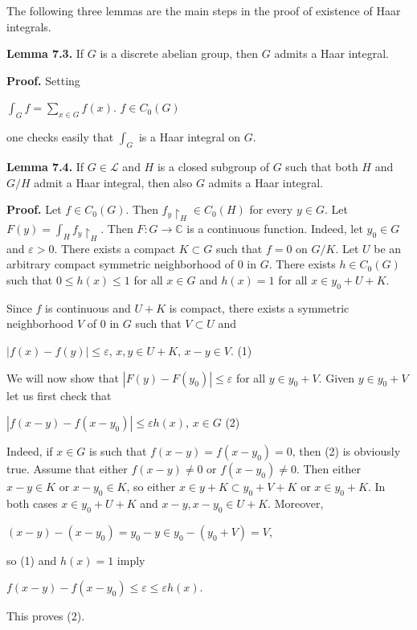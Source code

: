 \documentclass[12pt]{article}
\begin{document}
    The following three lemmas are the main steps in the proof of existence of Haar integrals.

\textbf{Lemma 7.3.} If $G$ is a discrete abelian group, then $G$ admits a Haar integral.


\textbf{Proof.} Setting


    $\int_G f = \sum_{x \in G} f(x)$. $f \in C_0 (G)$ 


one checks easily that $\int_G$ is a Haar integral on $G$.


\textbf{Lemma 7.4.} If $G \in \mathcal{L}$ and $H$ is a closed subgroup of $G$ such that both $H$ and $G/H$ admit a Haar integral, then also $G$ admits a Haar
integral.


\textbf{Proof.} Let $f \in C_0(G)$. Then $f_y \upharpoonright_H \in C_0(H)$ for every $y \in G$. Let $F(y) = \int_H f_y \upharpoonright_H$. Then $F : G \to \mathbb{C}$ is a continuous function.
Indeed, let $y_0 \in G$ and $\varepsilon > 0$. There exists a compact $K \subset G$ such that $f = 0$ on $G / K$. Let $U$ be an arbitrary compact
symmetric neighborhood of 0 in $G$. There exists $h \in C_0(G)$ such that $0 \leqslant h(x) \leqslant 1$ for all $x \in G$ and $h(x) = 1$ for all
$x \in y_0 + U + K$.


    Since $f$ is continuous and $U + K$ is compact, there exists a symmetric neighborhood $V$ of 0 in $G$ such that $V \subset U$ and


$|f(x) - f(y)| \leqslant \varepsilon$, $x,y \in U + K$, $x - y \in V$.  (1)


We will now show that $|F (y) - F (y_0)| \leqslant \varepsilon$ for all $y \in y_0 + V$. Given $y \in y_0 + V$ let us first check that


$|f(x - y) - f(x - y_0)| \leqslant \varepsilon h(x)$, $x \in G$  (2)


Indeed, if $x \in G$ is such that $f (x - y) = f (x - y_0) = 0$, then (2) is obviously true. Assume that either $f (x - y) \neq 0$ or
$f (x - y_0) \neq 0$. Then either $x - y \in K$ or $x - y_0 \in K$, so either $x \in y + K \subset y_0 + V + K$ or $x \in y_0 + K$. In both cases
$x \in y_0 + U + K$ and $x - y, x - y_0 \in U + K$. Moreover,


$(x - y) - (x - y_0) = y_0 - y \in y_0 - (y_0 + V) = V$,


so (1) and $h(x) = 1$ imply


$ f(x - y) - f(x - y_0) \leqslant \varepsilon \leqslant \varepsilon h(x)$.


This proves (2).
\end{document}
